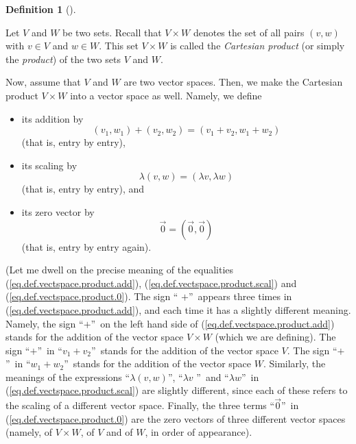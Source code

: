 \documentclass[numbers=enddot,12pt,final,onecolumn,notitlepage]{scrartcl}%
\theoremstyle{definition}
\newtheorem{defi}[theo]{Definition}
\newenvironment{definition}[1][]
{\begin{defi}[#1]\begin{leftbar}}
{\end{leftbar}\end{defi}}
\begin{document}
\begin{definition}
\label{def.vectspace.product}Let $V$ and $W$ be two sets. Recall that $V\times
W$ denotes the set of all pairs $\left(  v,w\right)  $ with $v\in V$ and $w\in
W$. This set $V\times W$ is called the \textit{Cartesian product} (or simply
the \textit{product}) of the two sets $V$ and $W$.

Now, assume that $V$ and $W$ are two vector spaces. Then, we make the
Cartesian product $V\times W$ into a vector space as well. Namely, we define

\begin{itemize}
\item its addition by%
\begin{equation}
\left(  v_{1},w_{1}\right)  +\left(  v_{2},w_{2}\right)  =\left(  v_{1}%
+v_{2},w_{1}+w_{2}\right)  \label{eq.def.vectspace.product.add}%
\end{equation}
(that is, entry by entry),

\item its scaling by%
\begin{equation}
\lambda\left(  v,w\right)  =\left(  \lambda v,\lambda w\right)
\label{eq.def.vectspace.product.scal}%
\end{equation}
(that is, entry by entry), and

\item its zero vector by%
\begin{equation}
\overrightarrow{0}=\left(  \overrightarrow{0},\overrightarrow{0}\right)
\label{eq.def.vectspace.product.0}%
\end{equation}
(that is, entry by entry again).
\end{itemize}

(Let me dwell on the precise meaning of the equalities
(\ref{eq.def.vectspace.product.add}), (\ref{eq.def.vectspace.product.scal})
and (\ref{eq.def.vectspace.product.0}). The sign \textquotedblleft%
$+$\textquotedblright\ appears three times in
(\ref{eq.def.vectspace.product.add}), and each time it has a slightly
different meaning. Namely, the sign \textquotedblleft$+$\textquotedblright\ on
the left hand side of (\ref{eq.def.vectspace.product.add}) stands for the
addition of the vector space $V\times W$ (which we are defining). The sign
\textquotedblleft$+$\textquotedblright\ in \textquotedblleft$v_{1}+v_{2}%
$\textquotedblright\ stands for the addition of the vector space $V$. The sign
\textquotedblleft$+$\textquotedblright\ in \textquotedblleft$w_{1}+w_{2}%
$\textquotedblright\ stands for the addition of the vector space $W$.
Similarly, the meanings of the expressions \textquotedblleft$\lambda\left(
v,w\right)  $\textquotedblright, \textquotedblleft$\lambda v$%
\textquotedblright\ and \textquotedblleft$\lambda w$\textquotedblright\ in
(\ref{eq.def.vectspace.product.scal}) are slightly different, since each of
these refers to the scaling of a different vector space. Finally, the three
terms \textquotedblleft$\overrightarrow{0}$\textquotedblright\ in
(\ref{eq.def.vectspace.product.0}) are the zero vectors of three different
vector spaces (namely, of $V\times W$, of $V$ and of $W$, in order of appearance).


\end{definition}
\end{document}
